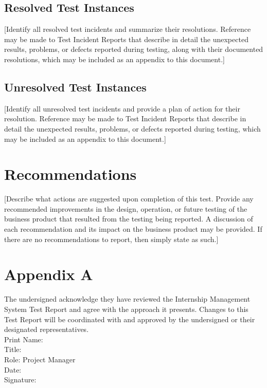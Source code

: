 \documentclass{l3deliverable}
\begin{document}
\subsection{Resolved Test Instances}
[Identify all resolved test incidents and summarize their resolutions.  Reference may be made to Test Incident Reports that describe in detail the unexpected results, problems, or defects reported during testing, along with their documented resolutions, which may be included as an appendix to this document.]

\subsection{Unresolved Test Instances}
[Identify all unresolved test incidents and provide a plan of action for their resolution.  Reference may be made to Test Incident Reports that describe in detail the unexpected results, problems, or defects reported during testing, which may be included as an appendix to this document.]

\section{Recommendations}
[Describe what actions are suggested upon completion of this test. Provide any recommended improvements in the design, operation, or future testing of the business product that resulted from the testing being reported.  A discussion of each recommendation and its impact on the business product may be provided.  If there are no recommendations to report, then simply state as such.]
\newpage
\section{Appendix A}
The undersigned acknowledge they have reviewed the Internship Management System Test Report and agree with the approach it presents. Changes to this Test Report will be coordinated with and approved by the undersigned or their designated representatives.\\
Print Name: \\
Title: \\
Role: Project Manager \\
Date: \\
Signature: \\
\end{document}

